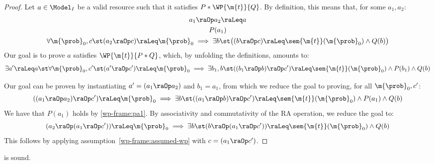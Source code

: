 \documentclass[acmsmall,nonacm,screen,appendix]{acmart}
\begin{document}
\begin{proof}
  Let $a\in\Model_I$ be a valid resource such that
  it satisfies $P \ast \WP {\m{t}} {Q}$.
  By definition, this means that, for some $a_1,a_2$:
  \begin{gather}
    a_1 \raOp a_2 \raLeq a
    \\
    P(a_1)
    \label{wp-frame:pa1}
    \\
    \forall \m{\prob}_0, c \st
      (a_2 \raOp c) \raLeq \m{\prob}_0
      \implies
        \exists b \st
        \bigl(
          (b \raOp c) \raLeq \sem{\m{t}}(\m{\prob}_0)
          \land
          Q(b)
        \bigr)
    \label{wp-frame:assumed-wp}
  \end{gather}
  Our goal is to prove $a$ satisfies
  $\WP {\m{t}} {P * Q}$, which,
  by unfolding the definitions, amounts to:
  \begin{equation}
    \exists a' \raLeq a \st
    \forall \m{\prob}_0, c' \st
      (a' \raOp c') \raLeq \m{\prob}_0
      \implies
      \exists b_1,b \st
        ((b_1 \raOp b) \raOp c') \raLeq \sem{\m{t}}(\m{\prob}_0)
        \land
        P(b_1) \land Q(b)
    \label{wp-frame:goal}
  \end{equation}

  Our goal can be proven by instantiating
  $a' = (a_1 \raOp a_2)$ and $b_1 = a_1$,
  from which we reduce the goal
  to proving, for all $\m{\prob}_0, c'$:
  \begin{equation}
      ((a_1 \raOp a_2) \raOp c') \raLeq \m{\prob}_0
      \implies
      \exists b \st
        ((a_1 \raOp b) \raOp c') \raLeq \sem{\m{t}}(\m{\prob}_0)
        \land
        P(a_1) \land Q(b)
  \end{equation}
  We have that $P(a_1)$ holds by \eqref{wp-frame:pa1}.
  By associativity and commutativity of the RA operation,
  we reduce the goal to:
  \begin{equation}
      (a_2 \raOp (a_1 \raOp c')) \raLeq \m{\prob}_0
      \implies
      \exists b \st
        (b \raOp (a_1 \raOp c')) \raLeq \sem{\m{t}}(\m{\prob}_0)
        \land
        Q(b)
  \end{equation}
  This follows by applying assumption~\eqref{wp-frame:assumed-wp}
  with $c = (a_1 \raOp c')$.
\end{proof}
 \begin{lemma}
\label{proof:wp-nest}
   is sound.
\end{lemma}
\end{document}
